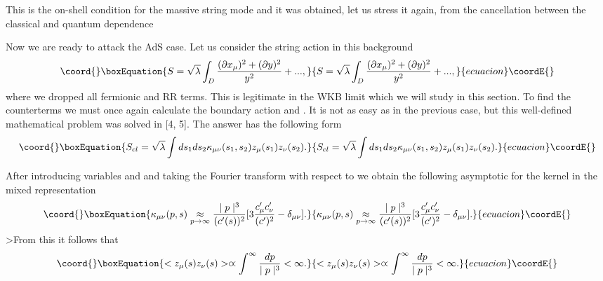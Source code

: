 \documentclass[a4paper,12pt]{article}
\begin{document}
This is the on-shell condition for the massive string mode and it was
obtained, let us stress it again, from the cancellation between the
classical and quantum \coordHE{} dependence

Now we are ready to attack the AdS case. Let us consider the string action
in this background 
\begin{equation}\coord{}\boxEquation{
S=\sqrt{\lambda }\int_{D}\frac{(\partial x_{\mu })^{2}+(\partial y)^{2}}{
y^{2}}+...,
}{
S=\sqrt{\lambda }\int_{D}\frac{(\partial x_{\mu })^{2}+(\partial y)^{2}}{
y^{2}}+...,
}{ecuacion}\coordE{}\end{equation}
where we dropped all fermionic and RR terms. This is legitimate in the WKB
limit \coordHE{} which we will study in this section. To find the
counterterms we must once again calculate the boundary action and \coordHE{}. It is not as easy as in the previous case,
but this well-defined mathematical problem was solved in [4, 5]. The answer
has the following form 
\begin{equation}\coord{}\boxEquation{
S_{cl}=\sqrt{\lambda }\int ds_{1}ds_{2}\kappa _{\mu \nu }(s_{1},s_{2})z_{\mu
}(s_{1})z_{\nu }(s_{2}).
}{
S_{cl}=\sqrt{\lambda }\int ds_{1}ds_{2}\kappa _{\mu \nu }(s_{1},s_{2})z_{\mu
}(s_{1})z_{\nu }(s_{2}).
}{ecuacion}\coordE{}\end{equation}

After introducing variables \coordHE{} and \coordHE{} and taking the Fourier transform with respect to \myHighlight{$\sigma $}\coordHE{} we
obtain the following asymptotic for the kernel in the mixed representation 
\begin{equation}\coord{}\boxEquation{
\kappa _{\mu \nu }(p,s)\underset{p\rightarrow \infty }{\approx }\frac{\mid
p\mid ^{3}}{(c'(s))^{2}}[3\frac{c'_{\mu }c'_{\nu
}}{(c')^{2}}-\delta _{\mu \nu }].
}{
\kappa _{\mu \nu }(p,s)\underset{p\rightarrow \infty }{\approx }\frac{\mid
p\mid ^{3}}{(c'(s))^{2}}[3\frac{c'_{\mu }c'_{\nu
}}{(c')^{2}}-\delta _{\mu \nu }].
}{ecuacion}\coordE{}\end{equation}
>From this it follows that 
\begin{equation}\coord{}\boxEquation{
<z_{\mu }(s)z_{\nu }(s)>\varpropto \int^{\infty }\frac{dp}{\mid p\mid ^{3}}
<\infty.
}{
<z_{\mu }(s)z_{\nu }(s)>\varpropto \int^{\infty }\frac{dp}{\mid p\mid ^{3}}
<\infty.
}{ecuacion}\coordE{}\end{equation}
\end{document}
